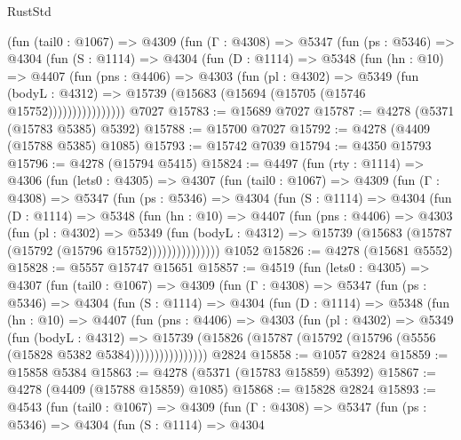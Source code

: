 \begin{lexlean}{RustStd}
\begin{coremodule}
          (fun (tail0 : @1067) =>
          @4309
            (fun (Γ : @4308) =>
            @5347
              (fun (ps : @5346) =>
              @4304
                (fun (S : @1114) =>
                @4304
                  (fun (D : @1114) =>
                  @5348
                    (fun (hn : @10) =>
                    @4407
                      (fun (pns : @4406) =>
                      @4303
                        (fun (pl : @4302) =>
                        @5349
                          (fun (bodyL : @4312) =>
                          @15739 (@15683 (@15694 (@15705 (@15746 @15752))))))))))))))))
    @7027
@15783 := @15689 @7027
@15787 := @4278 (@5371 (@15783 @5385) @5392)
@15788 := @15700 @7027
@15792 := @4278 (@4409 (@15788 @5385) @1085)
@15793 := @15742 @7039
@15794 := @4350 @15793
@15796 := @4278 (@15794 @5415)
@15824 := @4497
    (fun (rty : @1114) =>
    @4306
      (fun (lets0 : @4305) =>
      @4307
        (fun (tail0 : @1067) =>
        @4309
          (fun (Γ : @4308) =>
          @5347
            (fun (ps : @5346) =>
            @4304
              (fun (S : @1114) =>
              @4304
                (fun (D : @1114) =>
                @5348
                  (fun (hn : @10) =>
                  @4407
                    (fun (pns : @4406) =>
                    @4303
                      (fun (pl : @4302) =>
                      @5349
                        (fun (bodyL : @4312) =>
                        @15739 (@15683 (@15787 (@15792 (@15796 @15752)))))))))))))))
    @1052
@15826 := @4278 (@15681 @5552)
@15828 := @5557 @15747 @15651
@15857 := @4519
    (fun (lets0 : @4305) =>
    @4307
      (fun (tail0 : @1067) =>
      @4309
        (fun (Γ : @4308) =>
        @5347
          (fun (ps : @5346) =>
          @4304
            (fun (S : @1114) =>
            @4304
              (fun (D : @1114) =>
              @5348
                (fun (hn : @10) =>
                @4407
                  (fun (pns : @4406) =>
                  @4303
                    (fun (pl : @4302) =>
                    @5349
                      (fun (bodyL : @4312) =>
                      @15739
                        (@15826 (@15787 (@15792 (@15796 (@5556 (@15828 @5382 @5384))))))))))))))))
    @2824
@15858 := @1057 @2824
@15859 := @15858 @5384
@15863 := @4278 (@5371 (@15783 @15859) @5392)
@15867 := @4278 (@4409 (@15788 @15859) @1085)
@15868 := @15828 @2824
@15893 := @4543
    (fun (tail0 : @1067) =>
    @4309
      (fun (Γ : @4308) =>
      @5347
        (fun (ps : @5346) =>
        @4304
          (fun (S : @1114) =>
          @4304

\end{coremodule}
\end{lexlean}
